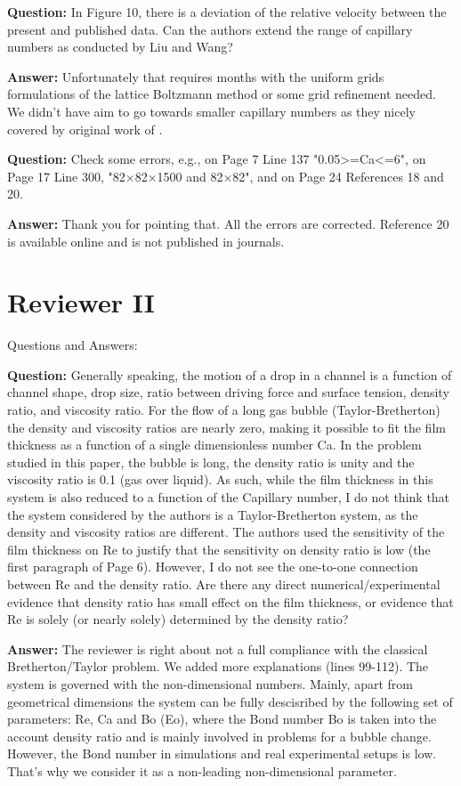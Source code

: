 \documentclass{article}
\begin{document}
\textbf{Question:} In Figure 10, there is a deviation of the relative velocity between the present and published data.
Can the authors extend the range of capillary numbers as conducted by Liu and Wang?

\textbf{Answer:} Unfortunately that requires months with the uniform grids formulations of the
lattice Boltzmann method or some grid refinement needed. We didn't have aim to go towards smaller
capillary numbers as they nicely covered by original work of \citet{bretherton}.

\textbf{Question:} Check some errors, e.g., on Page 7 Line 137 "0.05>=Ca<=6", on Page 17 Line 300, "82×82×1500 and
82×82", and on Page 24 References 18 and 20.

\textbf{Answer:} Thank you for pointing that. All the errors are corrected. Reference 20 is
available online and is not published in journals.

\section{Reviewer II}
Questions and Answers:

\textbf{Question:} Generally speaking, the motion of a drop in a channel is a function of channel shape, drop size,
ratio between driving force and surface tension, density ratio, and viscosity ratio.  For the flow
of a long gas bubble (Taylor-Bretherton) the density and viscosity ratios are nearly zero, making it
possible to fit the film thickness as a function of a single dimensionless number Ca.  In the
problem studied in this paper, the bubble is long, the density ratio is unity and the viscosity
ratio is 0.1 (gas over liquid).  As such, while the film thickness in this system is also reduced to
a function of the Capillary number, I do not think that the system considered by the authors is a
Taylor-Bretherton system, as the density and viscosity ratios are different. The authors used the sensitivity of the film thickness on Re to justify that the sensitivity on
density ratio is low (the first paragraph of Page 6).  However, I do not see the one-to-one
connection between Re and the density ratio.  Are there any direct numerical/experimental evidence
that density ratio has small effect on the film thickness, or evidence that Re is solely (or nearly
solely) determined by the density ratio?

\textbf{Answer:}  The reviewer is right about not a full compliance with the classical
Bretherton/Taylor problem. We added more explanations (lines 99-112). The system is governed with
the non-dimensional numbers. Mainly, apart from geometrical dimensions the system can be fully
descisribed by the following set of parameters: Re, Ca and Bo (Eo), where the Bond number Bo is
taken into the account density ratio and is mainly involved in problems for a bubble change.
However, the Bond number in simulations and real experimental setups is low. That's why we consider
it as a non-leading non-dimensional parameter. 
 
\end{document}
